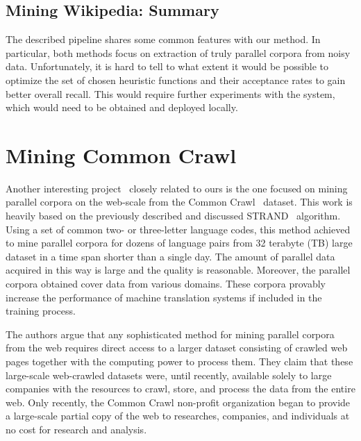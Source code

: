 \subsection{Mining Wikipedia: Summary}
\label{subsection:mining_wikipedia_summary}

The described pipeline shares some common features with our method. In particular, both methods focus on extraction of truly parallel corpora from noisy data. Unfortunately, it is hard to tell to what extent it would be possible to optimize the set of chosen heuristic functions and their acceptance rates to gain better overall recall. This would require further experiments with the system, which would need to be obtained and deployed locally.

\section{Mining Common Crawl}
\label{section:mining_common_crawl}

Another interesting project~\cite{Smith13} closely related to ours is the one focused on mining parallel corpora on the web-scale from the Common Crawl~\cite{CommonCrawl} dataset. This work is heavily based on the previously described and discussed STRAND~\cite{Resnik03} algorithm. Using a set of common two- or three-letter language codes, this method achieved to mine parallel corpora for dozens of language pairs from 32 terabyte (TB) large dataset in a time span shorter than a single day. The amount of parallel data acquired in this way is large and the quality is reasonable. Moreover, the parallel corpora obtained cover data from various domains. These corpora provably increase the performance of machine translation systems if included in the training process.

The authors argue that any sophisticated method for mining parallel corpora from the web requires direct access to a larger dataset consisting of crawled web pages together with the computing power to process them. They claim that these large-scale web-crawled datasets were, until recently, available solely to large companies with the resources to crawl, store, and process the data from the entire web. Only recently, the Common Crawl non-profit organization began to provide a large-scale partial copy of the web to researches, companies, and individuals at no cost for research and analysis.


